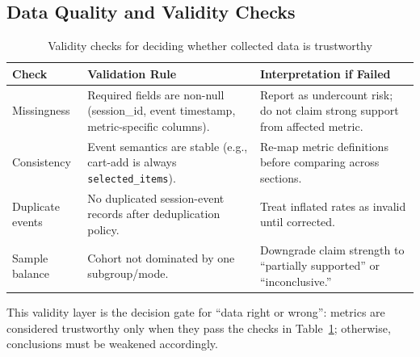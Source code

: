 \documentclass[12pt, twoside]{report}
\begin{document}
\subsection{Data Quality and Validity Checks}
\label{subsec:data_quality_validity}

\begin{table}[H]
\centering
\begin{tabular}{p{4.0cm}p{4.7cm}p{5.0cm}}
\toprule
\textbf{Check} & \textbf{Validation Rule} & \textbf{Interpretation if Failed}\\
\midrule
Missingness & Required fields are non-null (session\_id, event timestamp, metric-specific columns). & Report as undercount risk; do not claim strong support from affected metric.\\
Consistency & Event semantics are stable (e.g., cart-add is always \texttt{selected\_items}). & Re-map metric definitions before comparing across sections.\\
Duplicate events & No duplicated session-event records after deduplication policy. & Treat inflated rates as invalid until corrected.\\
Sample balance & Cohort not dominated by one subgroup/mode. & Downgrade claim strength to ``partially supported'' or ``inconclusive.''\\
\bottomrule
\end{tabular}
\caption{Validity checks for deciding whether collected data is trustworthy}
\label{tab:data_validity_checks}
\end{table}

This validity layer is the decision gate for ``data right or wrong'': metrics are considered trustworthy only when they pass the checks in Table~\ref{tab:data_validity_checks}; otherwise, conclusions must be weakened accordingly.
\end{document}
